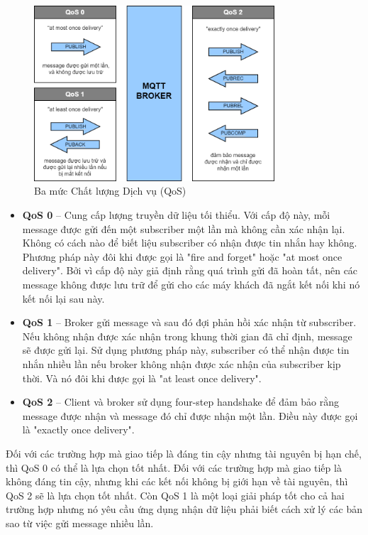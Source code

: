 \begin{figure}[!h]
    \centering
    \includegraphics[width=0.8\textwidth]{Images/Basis_knowledge/QoS.png}
    \caption{Ba mức Chất lượng Dịch vụ (QoS)}
    \label{fig:comp_mqtt}
\end{figure}

\begin{itemize}
    \item \textbf{QoS 0} – Cung cấp lượng truyền dữ liệu tối thiểu. Với cấp độ này, mỗi message được gửi đến một subscriber một lần mà không cần xác nhận lại. Không có cách nào để biết liệu subscriber có nhận được tin nhắn hay không. Phương pháp này đôi khi được gọi là "fire and forget" hoặc "at most once delivery". Bởi vì cấp độ này giả định rằng quá trình gửi đã hoàn tất, nên các message không được lưu trữ để gửi cho các máy khách đã ngắt kết nối khi nó kết nối lại sau này.
    \item \textbf{QoS 1} – Broker gửi message và sau đó đợi phản hồi xác nhận từ subscriber. Nếu không nhận được xác nhận trong khung thời gian đã chỉ định, message sẽ được gửi lại. Sử dụng phương pháp này, subscriber có thể nhận được tin nhắn nhiều lần nếu broker không nhận được xác nhận của subscriber kịp thời. Và nó đôi khi được gọi là "at least once delivery".
    \item \textbf{QoS 2} – Client và broker sử dụng four-step handshake để đảm bảo rằng message được nhận và message đó chỉ được nhận một lần. Điều này được gọi là "exactly once delivery".
\end{itemize}

Đối với các trường hợp mà giao tiếp là đáng tin cậy nhưng tài nguyên bị hạn chế, thì QoS 0 có thể là lựa chọn tốt nhất. Đối với các trường hợp mà giao tiếp là không đáng tin cậy, nhưng khi các kết nối không bị giới hạn về tài nguyên, thì QoS 2 sẽ là lựa chọn tốt nhất. Còn QoS 1 là một loại giải pháp tốt cho cả hai trường hợp nhưng nó yêu cầu ứng dụng nhận dữ liệu phải biết cách xử lý các bản sao từ việc gửi message nhiều lần.

